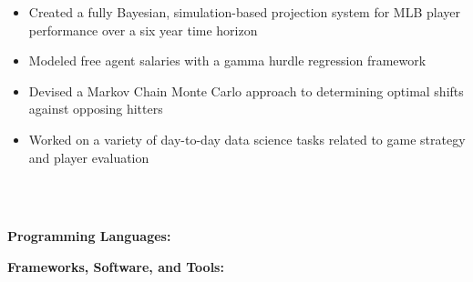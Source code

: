 \documentclass[10pt,a4paper,ragged2e,withhyper]{/Users/matt/documents/GitHub/mrkaye97.github.io/resume/altacv}
\begin{document}
		\divider

		\begin{itemize}
		\item Created a fully Bayesian, simulation-based projection system for MLB player performance over a six year time horizon
		\item Modeled free agent salaries with a gamma hurdle regression framework
		\item Devised a Markov Chain Monte Carlo approach to determining optimal shifts against opposing hitters
		\item Worked on a variety of day-to-day data science tasks related to game strategy and player evaluation
		\end{itemize}

		\setcolumnwidth{4cm, 5cm,5cm} 
		\begin{paracol}{3}

		
		\\
		\divider\\


		\switchcolumn
		
		\textbf{Programming Languages:}\\
		\medskip

		\smallskip
		\textbf{Frameworks, Software, and Tools:}\\
		\medskip

		 \\

		\switchcolumn
		
		
		\\
		\\
		\\
		\\
		\\
		\\
		\\
		
		\end{paracol}
\end{document}
